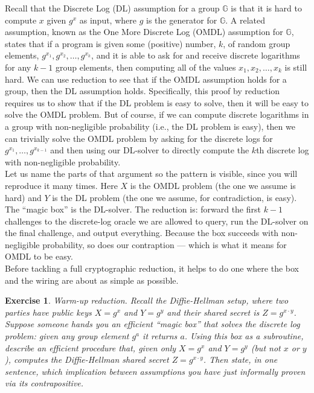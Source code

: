\documentclass[12pt]{article}
\newcommand{\G}[0]{\mathbb{G}}
\newtheorem{exercise}{Exercise}
\theoremstyle{definition}
\theoremstyle{remark}
\theoremstyle{definition}
\begin{document}
Recall that the Discrete Log (DL) assumption for a group $\G$ is that it is hard to compute $x$ given $g^x$ as input, where $g$ is the generator for $\G$. A related assumption, known as the One More Discrete Log (OMDL) assumption for $\G$, states that if a program is given some (positive) number, $k$, of random group elements, $g^{x_1},g^{x_2},\ldots, g^{x_k}$, and it is able to ask for and receive discrete logarithms for any $k-1$ group elements, then computing all of the values $x_1, x_2,\ldots, x_k$ is still hard. We can use reduction to see that if the OMDL assumption holds for a group, then the DL assumption holds. Specifically, this proof by reduction requires us to show that if the DL problem is easy to solve, then it will be easy to solve the OMDL problem. But of course, if we can compute discrete logarithms in a group with non-negligible probability (i.e., the DL problem is easy), then we can trivially solve the OMDL problem by asking for the discrete logs for $g^{x_1},\ldots, g^{x_{k-1}}$ and then using our DL-solver to directly compute the $k$th discrete log with non-negligible probability.\\

Let us name the parts of that argument so the pattern is visible, since you will reproduce it many times. Here $X$ is the OMDL problem (the one we assume is hard) and $Y$ is the DL problem (the one we assume, for contradiction, is easy). The ``magic box'' is the DL-solver. The reduction is: forward the first $k-1$ challenges to the discrete-log oracle we are allowed to query, run the DL-solver on the final challenge, and output everything. Because the box succeeds with non-negligible probability, so does our contraption --- which is what it means for OMDL to be easy.\\

Before tackling a full cryptographic reduction, it helps to do one where the box and the wiring are about as simple as possible.

\begin{exercise}\label{ex:warmup-reduction}
Warm-up reduction. Recall the Diffie-Hellman setup, where two parties have public keys $X = g^x$ and $Y = g^y$ and their shared secret is $Z = g^{x\cdot y}$. Suppose someone hands you an efficient ``magic box'' that solves the discrete log problem: given any group element $g^a$ it returns $a$. Using this box as a subroutine, describe an efficient procedure that, given only $X = g^x$ and $Y = g^y$ (but not $x$ or $y$), computes the Diffie-Hellman shared secret $Z = g^{x\cdot y}$. Then state, in one sentence, which implication between assumptions you have just informally proven via its contrapositive.
\end{exercise}
\end{document}
